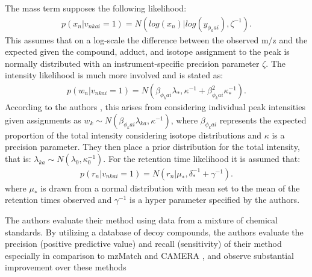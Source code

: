 \begin{DoubleSpace*}
The mass term supposes the following likelihood:
\begin{align}
	p(x_n|v_{nkai}=1) = N(log(x_n)|log(y_{\phi_k ai}),\zeta^{-1}). 
\end{align}
This assumes that on a log-scale the difference between the observed m/z and the expected given the compound, adduct, and isotope assignment to the peak is normally distributed with an instrument-specific precision parameter $\zeta$. The intensity likelihood is much more involved and is stated as:  
\begin{align}
	p(w_n|v_{nkai}=1)=N(\beta_{\phi_k ai} \lambda_{*},\kappa^{-1}+\beta^2_{\phi_k ai}\kappa^{-1}_{*}).
\end{align}
According to the authors \cite{daly2014}, this arises from considering individual peak intensities given assignments as $w_k\sim N(\beta_{\phi_k ai} \lambda_{ka},\kappa^{-1})$, where $\beta_{\phi_k ai}$ represents the expected proportion of the total intensity considering isotope distributions and $\kappa$ is a precision parameter. They then place a prior distribution for the total intensity, that is: $\lambda_{k a} \sim N(\lambda_0, \kappa_0^{-1})$. For the retention time likelihood it is assumed that:
\begin{align}
	p(r_n|v_{nkai}=1)=N(r_n|\mu_*,\delta_*^{-1}+\gamma^{-1}).
\end{align}
where $\mu_*$ is drawn from a normal distribution with mean set to the mean of the retention times observed and $\gamma^{-1}$ is a hyper parameter specified by the authors. 

The authors \cite{daly2014} evaluate their method using data from a mixture of chemical standards. By utilizing a database of decoy compounds, the authors evaluate the precision (positive predictive value) and recall (sensitivity) of their method especially in comparison to mzMatch and CAMERA \cite{kuhl2011}, and observe substantial improvement over these methods

\end{DoubleSpace*}